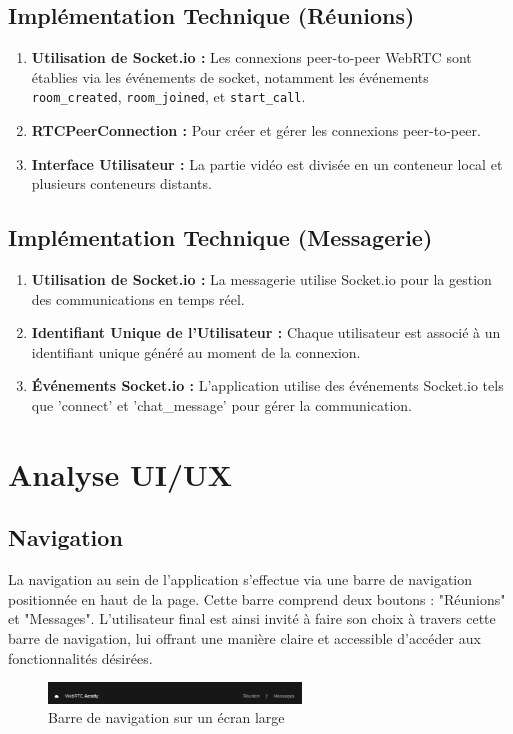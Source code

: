 \documentclass[12pt, a4paper, oneside]{Thesis}
\begin{document}
\subsection{Implémentation Technique (Réunions)}
\begin{enumerate}
    \item \textbf{Utilisation de Socket.io :} Les connexions peer-to-peer WebRTC sont établies via les événements de socket, notamment les événements \texttt{room\_created}, \texttt{room\_joined}, et \texttt{start\_call}.
    \item \textbf{RTCPeerConnection :} Pour créer et gérer les connexions peer-to-peer.
    \item \textbf{Interface Utilisateur :} La partie vidéo est divisée en un conteneur local et plusieurs conteneurs distants.
\end{enumerate}

\subsection{Implémentation Technique (Messagerie)}
\begin{enumerate}
    \item \textbf{Utilisation de Socket.io :} La messagerie utilise Socket.io pour la gestion des communications en temps réel.
    \item \textbf{Identifiant Unique de l'Utilisateur :} Chaque utilisateur est associé à un identifiant unique généré au moment de la connexion.
    \item \textbf{Événements Socket.io :} L'application utilise des événements Socket.io tels que 'connect' et 'chat\_message' pour gérer la communication.
\end{enumerate}

\section{Analyse UI/UX}
\subsection{Navigation}
La navigation au sein de l'application s'effectue via une barre de navigation positionnée en haut de la page. Cette barre comprend deux boutons : "Réunions" et "Messages". L'utilisateur final est ainsi invité à faire son choix à travers cette barre de navigation, lui offrant une manière claire et accessible d'accéder aux fonctionnalités désirées.

\begin{figure}[h]
    \centering
    \includegraphics[width=0.6\textwidth]{images/NavBarPC.png}
    \caption{Barre de navigation sur un écran large}
\end{figure}
\end{document}
